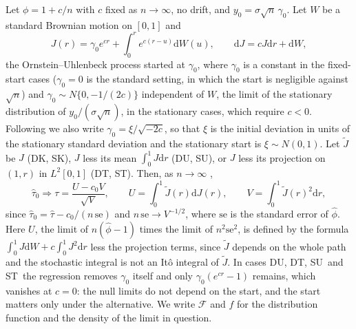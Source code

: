 \documentclass[ecta,nameyear,final]{econsocart}
\newcommand{\dr}[1]{{\mathrm d}#1}
\newcommand{\phih}{\hat\phi}
\newcommand{\tauh}{\hat\tau}
\newcommand{\Fk}{\textsf{\upshape DK}}
\newcommand{\Fu}{\textsf{\upshape DU}}
\newcommand{\Ft}{\textsf{\upshape DT}}
\newcommand{\Sk}{\textsf{\upshape SK}}
\newcommand{\Su}{\textsf{\upshape SU}}
\newcommand{\St}{\textsf{\upshape ST}}
\newcommand{\cF}{\mathcal{F}}
\theoremstyle{plain}
\theoremstyle{definition}
\begin{document}
Let $\phi=1+c/n$ with $c$ fixed as $n\to\infty$, no drift, and $y_0=\sigma\sqrt n\,\gamma_0$.  Let $W$ be a standard Brownian motion on $[0,1]$ and
\begin{equation}
J(r)=\gamma_0e^{cr}+\int_0^re^{c(r-u)}\dr{W(u)},\qquad\dr{J}=cJ\dr{r}+\dr{W},
\label{eq:J}
\end{equation}
the Ornstein--Uhlenbeck process started at $\gamma_0$, where $\gamma_0$ is a constant in the fixed-start cases ($\gamma_0=0$ is the standard setting, in which the start is negligible against $\sqrt n$) and $\gamma_0\sim N\{0,-1/(2c)\}$ independent of $W$, the limit of the stationary distribution of $y_0/(\sigma\sqrt n)$, in the stationary cases, which require $c<0$.  Following \cite{MullerElliott2003} we also write $\gamma_0=\xi/\sqrt{-2c}$, so that $\xi$ is the initial deviation in units of the stationary standard deviation and the stationary start is $\xi\sim N(0,1)$.  Let $\tilde J$ be $J$ (\Fk, \Sk), $J$ less its mean $\int_0^1J\dr{r}$ (\Fu, \Su), or $J$ less its projection on $(1,r)$ in $L^2[0,1]$ (\Ft, \St).  Then, as $n\to\infty$ \citep{Phillips1987,ChanWei1987,NabeyaSorensen1994},
\begin{equation}
\tauh_0\Rightarrow\tau=\frac{U-c_0V}{\sqrt V},\qquad U=\int_0^1\tilde J(r)\dr{J(r)},\qquad
V=\int_0^1\tilde J(r)^2\dr{r},
\label{eq:limit}
\end{equation}
since $\tauh_0=\tauh-c_0/(n\,\mathrm{se})$ and $n\,\mathrm{se}\to V^{-1/2}$, where $\mathrm{se}$ is the standard error of $\phih$.  Here $U$, the limit of $n(\phih-1)$ times the limit of $n^2\mathrm{se}^2$, is defined by the formula $\int_0^1J\dr{W}+c\int_0^1J^2\dr{r}$ less the projection terms, since $\tilde J$ depends on the whole path and the stochastic integral is not an It\^o integral of $\tilde J$.  In cases \Fu, \Ft, \Su\ and \St\ the regression removes $\gamma_0$ itself and only $\gamma_0(e^{cr}-1)$ remains, which vanishes at $c=0$: the null limits do not depend on the start, and the start matters only under the alternative.  We write $\cF$ and $f$ for the distribution function and the density of the limit in question.
\end{document}
